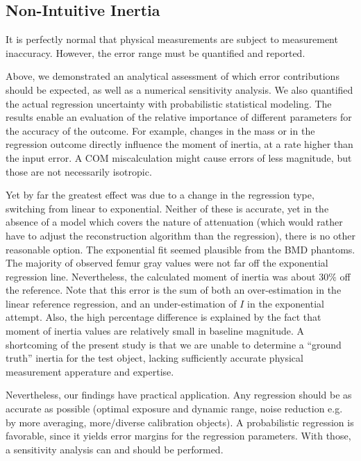 \subsection{Non-Intuitive Inertia}
\label{sec:org267fc97}
It is perfectly normal that physical measurements are subject to measurement inaccuracy.
However, the error range must be quantified and reported.

Above, we demonstrated an analytical assessment of which error contributions should be expected, as well as a numerical sensitivity analysis.
We also quantified the actual regression uncertainty with probabilistic statistical modeling.
The results enable an evaluation of the relative importance of different parameters for the accuracy of the outcome.
For example, changes in the mass or in the regression outcome directly influence the moment of inertia, at a rate higher than the input error.
A COM miscalculation might cause errors of less magnitude, but those are not necessarily isotropic.


Yet by far the greatest effect was due to a change in the regression type, switching from linear to exponential.
Neither of these is accurate, yet in the absence of a model which covers the nature of attenuation (which would rather have to adjust the reconstruction algorithm than the regression), there is no other reasonable option.
The exponential fit seemed plausible from the BMD phantoms.
The majority of observed femur gray values were not far off the exponential regression line.
Nevertheless, the calculated moment of inertia was about \(30\%\) off the reference.
Note that this error is the sum of both an over-estimation in the linear reference regression, and an under-estimation of \(I\) in the exponential attempt.
Also, the high percentage difference is explained by the fact that moment of inertia values are relatively small in baseline magnitude.
A shortcoming of the present study is that we are unable to determine a ``ground truth'' inertia for the test object, lacking sufficiently accurate physical measurement apperature and expertise.


Nevertheless, our findings have practical application.
Any regression should be as accurate as possible (optimal exposure and dynamic range, noise reduction e.g. by more averaging, more/diverse calibration objects).
A probabilistic regression is favorable, since it yields error margins for the regression parameters.
With those, a sensitivity analysis can and should be performed.


